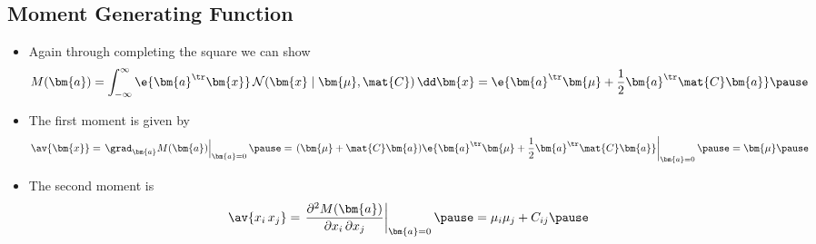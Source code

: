 \begin{slide}
\section{Moment Generating Function}

\begin{PauseHighLight}
  \begin{itemize}
  \item Again through completing the square we can show
    \begin{align*}
      M(\bm{a}) = \int_{-\infty}^{\infty} \e{\bm{a}^\tr \bm{x}} \,
      \mathcal{N}(\bm{x}\mid \bm{\mu}, \mat{C}) \, \dd \bm{x}
      = \e{\bm{a}^\tr \bm{\mu} + \frac{1}{2} \bm{a}^\tr \mat{C} \bm{a}}\pause
    \end{align*}
  \item The first moment is given by
    \begin{align*}
      \av{\bm{x}} = \left. \grad_{\bm{a}} M(\bm{a}) \right|_{\bm{a}=0}
      \pause = \left. (\bm{\mu} + \mat{C}
      \bm{a})\e{\bm{a}^\tr \bm{\mu} + \frac{1}{2} \bm{a}^\tr \mat{C}
      \bm{a}} \right|_{\bm{a}=0} \pause =
      \bm{\mu}\pause
    \end{align*}
  \item The second moment is
    \begin{align*}
      \av{x_i\,x_j} = \left. \frac{\partial^2 M(\bm{a})}{\partial
      x_i\,\partial x_j}  \right|_{\bm{a}=0} \pause= \mu_i \mu_j + C_{ij}\pause
    \end{align*}
  \end{itemize}
\end{PauseHighLight}

\end{slide}


